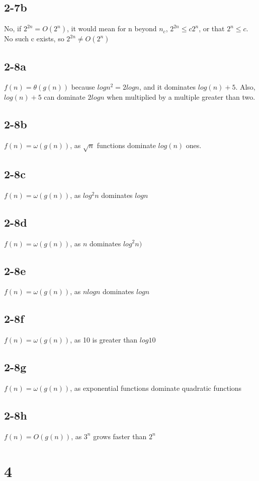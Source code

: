\documentclass[16pt]{article}
\begin{document}
\subsection*{2-7b}
\noindent No, if $2^{2n} = O(2^{n})$, it would mean for n beyond $n_{c}$, $2^{2n} \leq c2^{n}$, or that $2^{n} \leq c$.  No such c exists, so $2^{2n} \neq O(2^{n})$
\subsection*{2-8a}
\noindent $f(n) = \theta(g(n))$ because $logn^{2} = 2logn$, and it dominates $log(n) + 5$.  Also, $log(n) + 5$ can dominate $2logn$ when multiplied by a multiple greater than two.
\subsection*{2-8b}
\noindent $f(n) = \omega(g(n))$, as $\sqrt{n}$ functions dominate $log(n)$ ones.
\subsection*{2-8c}
\noindent $f(n) = \omega(g(n))$, as $log^{2}n$ dominates $logn$
\subsection*{2-8d}
\noindent $f(n) = \omega(g(n))$, as $n$ dominates $log^{2}n)$
\subsection*{2-8e}
\noindent $f(n) = \omega(g(n))$, as $nlogn$ dominates $logn$
\subsection*{2-8f}
\noindent $f(n) = \omega(g(n))$, as 10 is greater than $log10$
\subsection*{2-8g}
\noindent $f(n) = \omega(g(n))$, as exponential functions dominate quadratic functions
\subsection*{2-8h}
\noindent $f(n) = O(g(n))$, as $3^{n}$ grows faster than $2^{n}$

\section*{4}
\end{document}
